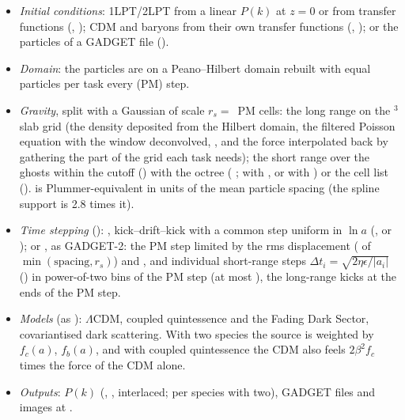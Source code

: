 \begin{itemize}
\item \emph{Initial conditions}: 1LPT/2LPT from a linear $P(k)$ at $z=0$ or from transfer functions (,
       ); CDM and baryons from their own transfer functions
      (,  ); or the particles of a GADGET file
      ().
\item \emph{Domain}: the particles are on a Peano--Hilbert domain rebuilt with equal particles per task every (PM)
      step.
\item \emph{Gravity}, split with a Gaussian of scale $r_s=$\, PM cells: the long range on the
      $^3$ slab grid (the density deposited from the Hilbert domain, the filtered Poisson equation with the
      window deconvolved, , and the force interpolated back by gathering the part of the grid each task
      needs); the short range over the ghosts within the cutoff () with the octree
      ( ;   with , or
       with ) or the cell list ().  is
      Plummer-equivalent in units of the mean particle spacing (the spline support is 2.8 times it).
\item \emph{Time stepping} (): , kick--drift--kick with a common step uniform in
      $\ln a$ (, or ); or , as GADGET-2: the PM step limited by
      the rms displacement ( of $\min(\text{spacing},r_s)$) and , and
      individual short-range steps $\Delta t_i=\sqrt{2\eta\epsilon/|a_i|}$ () in power-of-two bins of the PM
      step (at most ), the long-range kicks at the ends of the PM step.
\item \emph{Models} (as ): $\Lambda$CDM, coupled quintessence and the Fading Dark Sector, covariantised
      dark scattering. With two species the source is weighted by $f_c(a)$, $f_b(a)$, and with coupled quintessence the
      CDM also feels $2\beta^2f_c$ times the force of the CDM alone.
\item \emph{Outputs}: $P(k)$ (, , interlaced; per species with two),
      GADGET files and images at .
\end{itemize}

